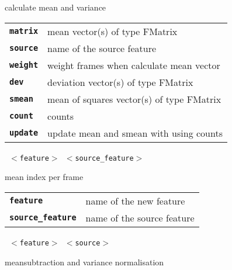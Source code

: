 \begin{description}
\begin{description}
        calculate mean and variance

      \begin{tabular}{ll}
 \texttt{\textbf{matrix}} &  mean vector(s) of type FMatrix \\
 \texttt{\textbf{source}} &  name of the source feature \\
 \texttt{\textbf{weight}} &   weight frames when calculate mean vector \\
 \texttt{\textbf{dev}} &      deviation vector(s) of type FMatrix \\
 \texttt{\textbf{smean}} &    mean of squares vector(s) of type FMatrix \\
 \texttt{\textbf{count}} &    counts \\
 \texttt{\textbf{update}} &   update mean and smean with using counts  \\
      \end{tabular}
       \texttt{ $<$feature$>$ $<$source\_feature$>$} \

        mean index per frame

      \begin{tabular}{ll}
 \texttt{\textbf{feature}} &         name of the new feature \\
 \texttt{\textbf{source\_feature}} &  name of the source feature \\
      \end{tabular}
       \texttt{ $<$feature$>$ $<$source$>$          } \

        meansubtraction and variance normalisation


\end{description}
\end{description}
